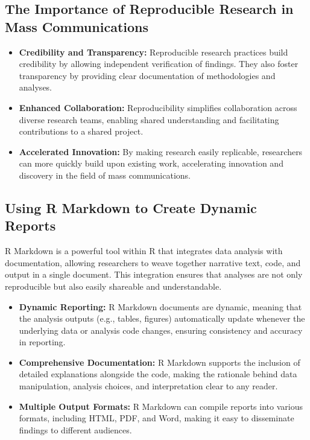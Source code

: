 \documentclass[
]{book}
\begin{document}
\subsection*{The Importance of Reproducible Research in Mass Communications}\label{the-importance-of-reproducible-research-in-mass-communications}

\begin{itemize}
\item
  \textbf{Credibility and Transparency:} Reproducible research practices build credibility by allowing independent verification of findings. They also foster transparency by providing clear documentation of methodologies and analyses.
\item
  \textbf{Enhanced Collaboration:} Reproducibility simplifies collaboration across diverse research teams, enabling shared understanding and facilitating contributions to a shared project.
\item
  \textbf{Accelerated Innovation:} By making research easily replicable, researchers can more quickly build upon existing work, accelerating innovation and discovery in the field of mass communications.
\end{itemize}

\subsection*{Using R Markdown to Create Dynamic Reports}\label{using-r-markdown-to-create-dynamic-reports}

R Markdown is a powerful tool within R that integrates data analysis with documentation, allowing researchers to weave together narrative text, code, and output in a single document. This integration ensures that analyses are not only reproducible but also easily shareable and understandable.

\begin{itemize}
\item
  \textbf{Dynamic Reporting:} R Markdown documents are dynamic, meaning that the analysis outputs (e.g., tables, figures) automatically update whenever the underlying data or analysis code changes, ensuring consistency and accuracy in reporting.
\item
  \textbf{Comprehensive Documentation:} R Markdown supports the inclusion of detailed explanations alongside the code, making the rationale behind data manipulation, analysis choices, and interpretation clear to any reader.
\item
  \textbf{Multiple Output Formats:} R Markdown can compile reports into various formats, including HTML, PDF, and Word, making it easy to disseminate findings to different audiences.
\end{itemize}
\end{document}
